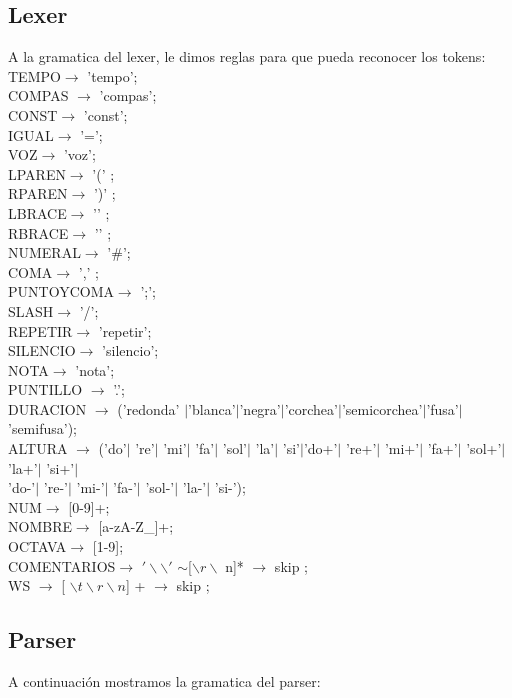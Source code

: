 \documentclass[a4paper]{article}
\begin{document}
\subsection{Lexer}
A la gramatica del lexer, le dimos reglas para que pueda reconocer los tokens:\\
TEMPO$\rightarrow$ 'tempo'; \\
COMPAS $\rightarrow$ 'compas'; \\
CONST$\rightarrow$ 'const';\\
IGUAL$\rightarrow$ '=';\\
VOZ$\rightarrow$ 'voz';\\
LPAREN$\rightarrow$ '(' ;\\
RPAREN$\rightarrow$ ')' ;\\
LBRACE$\rightarrow$ '{' ;\\
RBRACE$\rightarrow$ '}' ;\\
NUMERAL$\rightarrow$  '\#';\\
COMA$\rightarrow$ ',' ;\\
PUNTOYCOMA$\rightarrow$ ';';\\
SLASH$\rightarrow$ '/';\\
REPETIR$\rightarrow$ 'repetir';\\
SILENCIO$\rightarrow$ 'silencio';\\
NOTA$\rightarrow$  'nota';\\
PUNTILLO $\rightarrow$ '.';\\
DURACION $\rightarrow$ ('redonda' $|$'blanca'$|$'negra'$|$'corchea'$|$'semicorchea'$|$'fusa'$|$'semifusa');\\
ALTURA $\rightarrow$ ('do'$|$ 're'$|$ 'mi'$|$ 'fa'$|$ 'sol'$|$ 'la'$|$ 'si'$|$'do+'$|$ 're+'$|$ 'mi+'$|$ 'fa+'$|$ 'sol+'$|$ 'la+'$|$ 'si+'$|$\\
	'do-'$|$ 're-'$|$ 'mi-'$|$ 'fa-'$|$ 'sol-'$|$ 'la-'$|$ 'si-');\\
NUM$\rightarrow$ [0-9]+;\\
NOMBRE$\rightarrow$ $[$a-zA-Z\_$]$+;\\
OCTAVA$\rightarrow$ [1-9];\\
COMENTARIOS$\rightarrow$   $'\backslash\backslash'$ $\sim$[$\backslash r \backslash$ n]*  $\rightarrow$ skip ;\\
WS $\rightarrow$ [ $\backslash t \backslash r \backslash n$] + $\rightarrow$ skip ;\\

\newpage

\subsection{Parser}
A continuación mostramos la gramatica del parser:\\
\end{document}
